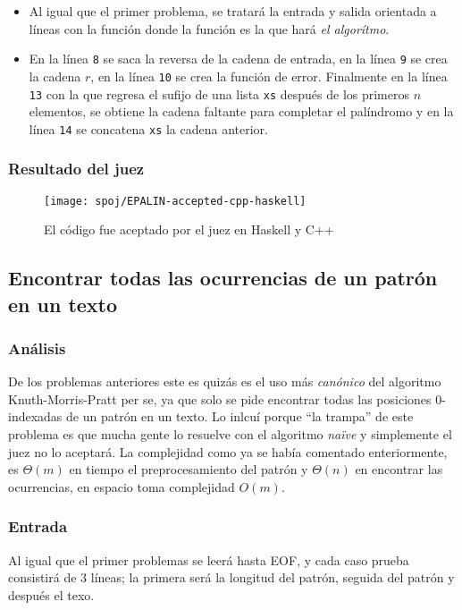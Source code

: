 \begin{itemize}
\item Al igual que el primer problema, se tratará la entrada y salida orientada a líneas con
la función  donde la función  es la que hará \textit{el algorítmo}.
\item En la línea \texttt{8} se saca la reversa de la cadena de entrada, en la línea \texttt{9}
se crea la cadena $r$, en la línea \texttt{10} se crea la función de error. Finalmente en la línea
\texttt{13} con la  que regresa el sufijo de una lista
\texttt{xs} después de los primeros $n$ elementos, se obtiene la cadena faltante para completar el
palíndromo y en la línea \texttt{14} se concatena \texttt{xs} la cadena anterior.
\end{itemize}

\subsubsection{Resultado del juez}
\begin{figure}[H]
\centering
\texttt{[image: spoj/EPALIN-accepted-cpp-haskell]}
\caption{El código fue aceptado por el juez en Haskell y C++}
\end{figure}

\newpage


\subsection{Encontrar todas las ocurrencias de un patrón en un texto}

\subsubsection{Análisis}
De los problemas anteriores este es quizás es el uso más \textit{canónico} del algoritmo
Knuth-Morris-Pratt per se, ya que solo se pide encontrar todas las posiciones 0-indexadas de
un patrón en un texto. Lo inlcuí porque ``la trampa'' de este problema es que mucha gente lo
resuelve con el algoritmo \textit{naïve} y simplemente el juez no lo aceptará. La complejidad como
ya se había comentado enteriormente, es $\Theta(m)$ en tiempo el preprocesamiento del patrón y
$\Theta(n)$ en encontrar las ocurrencias, en espacio toma complejidad $O(m)$.

\subsubsection{Entrada}
Al igual que el primer problemas se leerá hasta EOF, y cada caso prueba consistirá de 3 líneas;
la primera será la longitud del patrón, seguida del patrón y después el texo.

